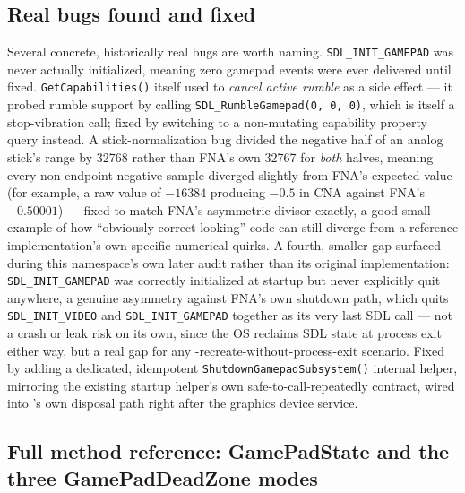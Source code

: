 \subsection{Real bugs found and fixed}

Several concrete, historically real bugs are worth naming. \texttt{SDL\_INIT\_GAMEPAD} was
never actually initialized, meaning zero gamepad events were ever delivered until fixed.
\texttt{GetCapabilities()} itself used to \emph{cancel active rumble} as a side effect ---
it probed rumble support by calling \texttt{SDL\_RumbleGamepad(0, 0, 0)}, which is itself a
stop-vibration call; fixed by switching to a non-mutating capability property query instead.
A stick-normalization bug divided the negative half of an analog stick's range by 32768
rather than FNA's own 32767 for \emph{both} halves, meaning every non-endpoint negative
sample diverged slightly from FNA's expected value (for example, a raw value of $-16384$
producing $-0.5$ in CNA against FNA's $-0.50001$) --- fixed to match FNA's asymmetric divisor
exactly, a good small example of how ``obviously correct-looking'' code can still diverge
from a reference implementation's own specific numerical quirks. A fourth, smaller gap
surfaced during this namespace's own later audit rather than its original implementation:
\texttt{SDL\_INIT\_GAMEPAD} was correctly initialized at startup but never explicitly quit
anywhere, a genuine asymmetry against FNA's own shutdown path, which quits
\texttt{SDL\_INIT\_VIDEO} and \texttt{SDL\_INIT\_GAMEPAD} together as its very last SDL call ---
not a crash or leak risk on its own, since the OS reclaims SDL state at process exit either
way, but a real gap for any -recreate-without-process-exit scenario.
Fixed by adding a dedicated, idempotent \texttt{ShutdownGamepadSubsystem()} internal helper,
mirroring the existing startup helper's own safe-to-call-repeatedly contract, wired into
's own disposal path right after the graphics device service.

\subsection{Full method reference: GamePadState and the three GamePadDeadZone modes}

